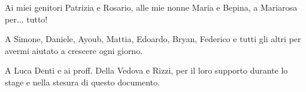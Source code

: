 \begin{flushright}
Ai miei genitori Patrizia e Rosario, alle mie nonne Maria e Bepina, a Mariarosa per... tutto!

\bigskip

A Simone, Daniele, Ayoub, Mattia, Edoardo, Bryan, Federico e tutti gli altri per avermi aiutato a crescere ogni giorno.

\bigskip

A Luca Denti e ai proff. Della Vedova e Rizzi, per il loro supporto durante lo stage e nella stesura di questo documento.

\end{flushright}